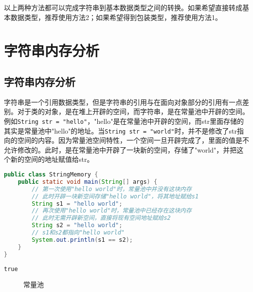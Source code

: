 以上两种方法都可以完成字符串到基本数据类型之间的转换。如果希望直接转成基本数据类型，推荐使用方法2；如果希望得到包装类型，推荐使用方法1。

\newpage

\section{字符串内存分析}

\subsection{字符串内存分析}

字符串是一个引用数据类型，但是字符串的引用与在面向对象部分的引用有一点差别。对于类的对象，是在堆上开辟的空间，而字符串，是在常量池中开辟的空间。\\

例如\lstinline|String str = "hello"|，"hello"是在常量池中开辟的空间，而str里面存储的其实是常量池中"hello"的地址。当\lstinline|String str = "world"|时，并不是修改了str指向的空间的内容。因为常量池空间特性，一个空间一旦开辟完成了，里面的值是不允许修改的。此时，是在常量池中开辟了一块新的空间，存储了"world"，并把这个新的空间的地址赋值给str。\\


\begin{lstlisting}[language=Java]
public class StringMemory {
    public static void main(String[] args) {
        // 第一次使用"hello world"时，常量池中并没有这块内存
        // 此时开辟一块新空间存储"hello world"，将其地址赋给s1
        String s1 = "hello world";
        // 再次使用"hello world"时，常量池中已经存在这块内存
        // 此时无需开辟新空间，直接将现有空间地址赋给s2
        String s2 = "hello world";
        // s1和s2都指向"hello world"
        System.out.println(s1 == s2);
    }
}
\end{lstlisting}

\begin{tcolorbox}
	\begin{verbatim}
true
	\end{verbatim}
\end{tcolorbox}

\begin{figure}[H]
	\centering
	\caption{常量池}
\end{figure}

